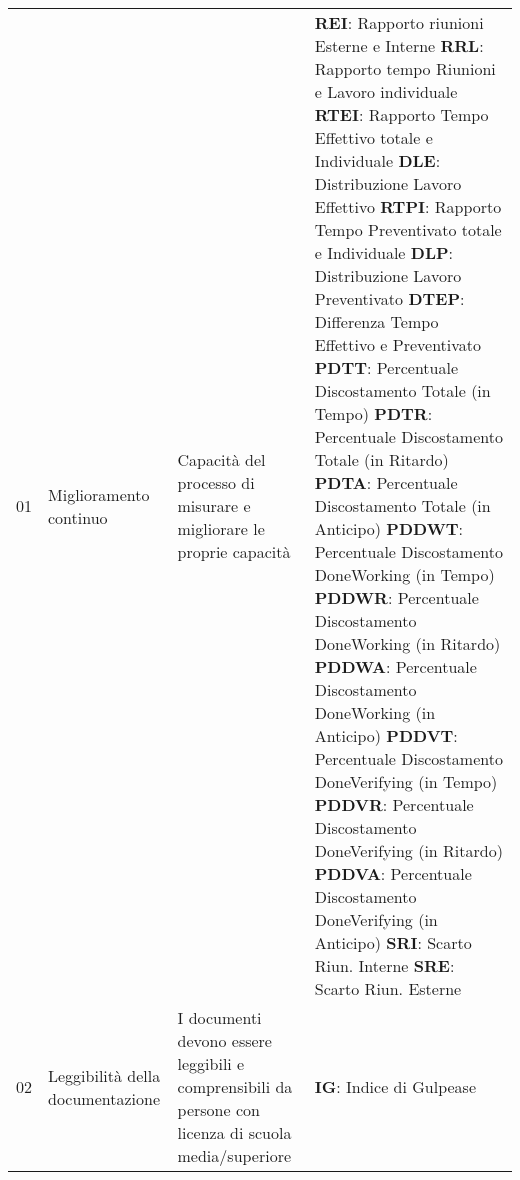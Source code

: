 \begin{longtable}{ 
		>{}p{} 
		>{}p{}
        >{}p{}
        >{\centering}p{} }
        01 & Miglioramento continuo & Capacità del processo di misurare e migliorare le proprie capacità & 
                         \textbf{REI}: Rapporto riunioni Esterne e Interne \newline
                         \textbf{RRL}: Rapporto tempo Riunioni e Lavoro individuale \newline
                         \textbf{RTEI}: Rapporto Tempo Effettivo totale e Individuale \newline
                         \textbf{DLE}: Distribuzione Lavoro Effettivo \newline
                         \textbf{RTPI}: Rapporto Tempo Preventivato totale e Individuale \newline
                         \textbf{DLP}: Distribuzione Lavoro Preventivato \newline 
                         \textbf{DTEP}: Differenza Tempo Effettivo e Preventivato \newline 
                         \textbf{PDTT}: Percentuale Discostamento Totale (in Tempo) \newline 
                         \textbf{PDTR}: Percentuale Discostamento Totale (in Ritardo) \newline 
                         \textbf{PDTA}: Percentuale Discostamento Totale (in Anticipo) \newline 
                         \textbf{PDDWT}: Percentuale Discostamento DoneWorking (in Tempo) \newline 
                         \textbf{PDDWR}: Percentuale Discostamento DoneWorking (in Ritardo) \newline 
                         \textbf{PDDWA}: Percentuale Discostamento DoneWorking (in Anticipo) \newline 
                         \textbf{PDDVT}: Percentuale Discostamento DoneVerifying (in Tempo) \newline
                         \textbf{PDDVR}: Percentuale Discostamento DoneVerifying (in Ritardo) \newline
                         \textbf{PDDVA}: Percentuale Discostamento DoneVerifying (in Anticipo) \newline
                         \textbf{SRI}: Scarto Riun. Interne \newline 
                         \textbf{SRE}: Scarto Riun. Esterne 
                         \tabularnewline

        02 & Leggibilità della documentazione & I documenti devono essere leggibili e comprensibili da persone con licenza di scuola media/superiore & \textbf{IG}: Indice di Gulpease \tabularnewline


\end{longtable}
